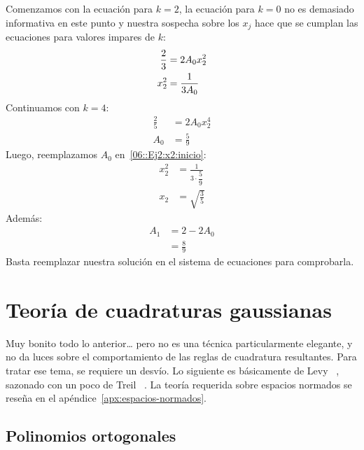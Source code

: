 \begin{ejemplo}
    Comenzamos con la ecuación para \(k = 2\),
    la ecuación para \(k = 0\) no es demasiado informativa en este punto
    y nuestra sospecha sobre los \(x_j\)
    hace que se cumplan las ecuaciones para valores impares de \(k\):
    \begin{align}
      \frac{2}{3}
        &= 2 A_0 x_2^2
             \notag \\
      x_2^2
        &= \frac{1}{3 A_0}
             \label{06::Ej2:x2:inicio}
    \end{align}
    Continuamos con \(k = 4\):
    \begin{align*}
      \frac{2}{5}
        & = 2 A_0 x_2^4 \\
      A_0
        &= \frac{5}{9}
    \end{align*}
    Luego,
    reemplazamos \(A_0\) en~\eqref{06::Ej2:x2:inicio}:
    \begin{align*}
      x_2^2
        &= \frac{1}{3\cdot \dfrac{5}{9}} \\
      x_2
        &= \sqrt{\frac{3}{5}}
    \end{align*}
    Además:
    \begin{align*}
      A_1
        &= 2 - 2 A_0 \\
        &= \frac{8}{9}
    \end{align*}
    Basta reemplazar nuestra solución en el sistema de ecuaciones
    para comprobarla.
  \end{ejemplo}

\section{Teoría de cuadraturas gaussianas}
\label{sec:cuadratura-gauss-teo}

  Muy bonito todo lo anterior\ldots{}
  pero no es una técnica particularmente elegante,
  y no da luces
  sobre el comportamiento de las reglas de cuadratura resultantes.
  Para tratar ese tema,
  se requiere un desvío.
  Lo siguiente es básicamente de Levy~%
    \cite[capítulos~4 y~6]{levy10:_introd_numer_analy},
  sazonado con un poco de Treil~%
    \cite[capítulo~5]{treil17:_linear_algeb_done_wrong}.
  La teoría requerida sobre espacios normados
  se reseña en el apéndice~\ref{apx:espacios-normados}.

\subsection{Polinomios ortogonales}
\label{sec:polinomios-ortogonales}

